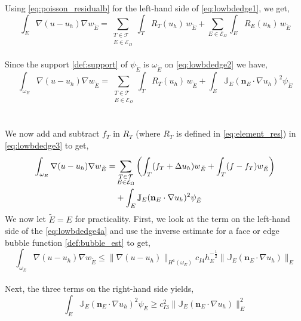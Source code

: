 Using \eqref{eq:poisson_residualb} for the left-hand side of \eqref{eq:lowbdedge1}, we get,
\begin{equation}\label{eq:lowbdedge2}
\displaystyle\int_E \nabla (u-u_h) \nabla w_{\tilde{E}} =  \displaystyle\sum_{\substack{T \in \mathcal{T} \\ E \in \mathcal{E}_\Omega}} \displaystyle\int_T R_T(u_h)\, w_{\tilde{E}}  + \displaystyle\sum_{E \in \mathcal{E}_\Omega} \displaystyle\int_E R_E(u_h) \, w_{\tilde{E}} 
\end{equation}
\\
Since the support \eqref{def:support} of $\psi_{\tilde{E}}$ is $\omega_{\tilde{E}}$ on \eqref{eq:lowbdedge2} we have, 
\begin{equation}\label{eq:lowbdedge3}
\int_{\omega_E} \nabla (u-u_h) \nabla w_{\tilde{E}} = \sum_{\substack{T \in \mathcal{T} \\ E \in \mathcal{E}_\Omega}} \int_T R_T(u_h)\, w_{\tilde{E}} + \int_E \mathbb{J}_E(\mathbf{n}_E \cdot \nabla u_h)^2 \psi_{\tilde{E}}
\end{equation}
\\
\\
We now add and subtract $f_T$ in $R_T$ (where $R_T$ is defined in \eqref{eq:element_res}) in \eqref{eq:lowbdedge3} to get, 
\begin{align}\label{eq:lowbdedge4a}
\int_{\omega_E} \nabla (u-u_h) \nabla w_{\tilde{E}} = & \sum_{\substack{T \in \mathcal{T} \\ E \in \mathcal{E}_\Omega}} \left( \int_T (f_T + \Delta u_h) w_{\tilde{E}} + \int_T (f-f_T)w_{\tilde{E}}\right) \\
& + \int_E \mathbb{J}_E(\mathbf{n}_E \cdot \nabla u_h)^2 \psi_{\tilde{E}} \notag
\end{align}
We now let $\tilde{E} = E$ for practicality. First, we look at the term on the left-hand side of the \eqref{eq:lowbdedge4a} and use the inverse estimate for a face or edge bubble function \eqref{def:bubble_est} to get,
\begin{equation} \label{eq:lowbdedge5}
\displaystyle\int_{\omega_E} \nabla (u-u_h) \nabla w_{\tilde{E}} \leq \| \nabla (u-u_h) \|_{H^1(\omega_E)} c_{I4}h_E^{-\frac{1}{2}} \|\mathbb{J}_E(\mathbf{n}_E \cdot \nabla u_h)\|_E
\end{equation} 
\\
Next, the three terms on the right-hand side yields,
\\
\begin{equation} \label{eq:lowbdedge6}
\displaystyle\int_E \mathbb{J}_E(\mathbf{n}_E \cdot \nabla u_h)^2 \psi_E \geq c_{I3}^2 \|\mathbb{J}_E(\mathbf{n}_E \cdot \nabla u_h)\|_E^2
\end{equation}
